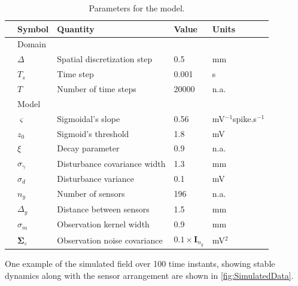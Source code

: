 \documentclass[10pt,twocolumn,twoside]{IEEEtran}
\begin{document}
\begin {table}[t]
\begin{center}
	{\tiny\begin{tabular}{lllll}
	\hline \hline
	& Symbol & Quantity &Value& Units\\ 
	\hline 
	& Domain&&& \\
	& $\Delta$ &Spatial discretization step&0.5&mm \\ 
 	& $T_s$ &Time step&0.001&s \\ 
 	& $T$ &Number of time steps&20000&n.a. \\ 
 	&Model&&& \\
 	& $\varsigma$ &Sigmoidal's slope&0.56&mV$^{-1}$spike.s$^{-1}$ \\ 
 	& $z_0$ &Sigmoid's threshold &1.8&mV \\ 
 	& $\xi$ &Decay parameter&0.9 &n.a. \\  
  & $\sigma_{\gamma}$ &Disturbance covariance width&1.3 &mm \\  
  & $\sigma_{d}$ &Disturbance variance&0.1 &mV \\  
  & $n_{y}$ &Number of sensors&196 &n.a. \\  
  & $\Delta_{y}$ &Distance between sensors&1.5 &mm \\  
  & $\sigma_{m}$ &Observation kernel width&0.9 &mm \\  
  & $\boldsymbol\Sigma_{\varepsilon}$ &Observation noise covariance&$0.1\times\mathbf{I}_{n_y}$ &mV$^2$ \\  
 	\hline \hline
	\end{tabular}}
 \caption {Parameters for the model. } 
 \label{table:SimulationParameters}
 \end{center}
 \end {table}
 One example of the simulated field over 100 time instants, showing stable dynamics along with the sensor arrangement are shown in \figurename{\ref{fig:SimulatedData}}.
\end{document}
